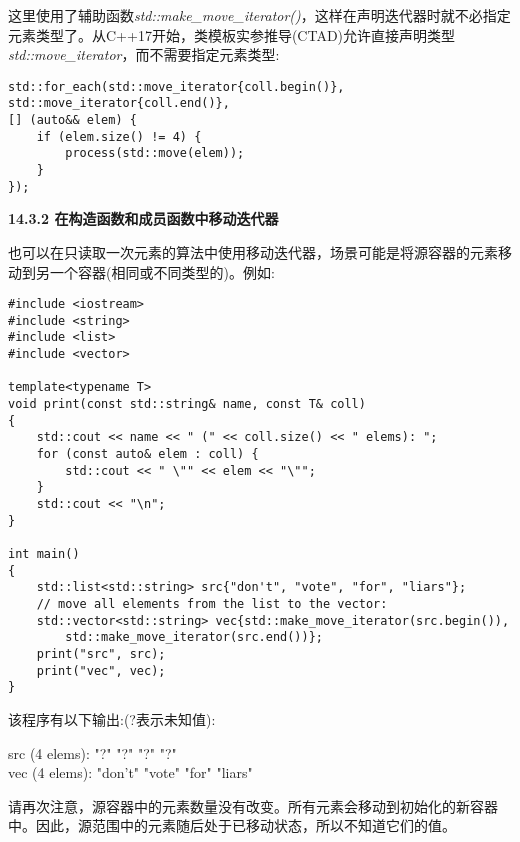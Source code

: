 这里使用了辅助函数\textit{std::make\_move\_iterator()}，这样在声明迭代器时就不必指定元素类型了。从C++17开始，类模板实参推导(CTAD)允许直接声明类型\textit{std::move\_iterator}，而不需要指定元素类型:\par

\begin{lstlisting}[caption={}]
std::for_each(std::move_iterator{coll.begin()},
std::move_iterator{coll.end()},
[] (auto&& elem) {
	if (elem.size() != 4) {
		process(std::move(elem));
	}
});
\end{lstlisting}

\hspace*{\fill} \par %
\textbf{14.3.2 在构造函数和成员函数中移动迭代器}

也可以在只读取一次元素的算法中使用移动迭代器，场景可能是将源容器的元素移动到另一个容器(相同或不同类型的)。例如:\par

{\color{red}{lib/moveitor.cpp}}\par

\begin{lstlisting}[caption={}]
#include <iostream>
#include <string>
#include <list>
#include <vector>

template<typename T>
void print(const std::string& name, const T& coll)
{
	std::cout << name << " (" << coll.size() << " elems): ";
	for (const auto& elem : coll) {
		std::cout << " \"" << elem << "\"";
	}
	std::cout << "\n";
}

int main()
{
	std::list<std::string> src{"don't", "vote", "for", "liars"};
	// move all elements from the list to the vector:
	std::vector<std::string> vec{std::make_move_iterator(src.begin()),
		std::make_move_iterator(src.end())};
	print("src", src);
	print("vec", vec);
}
\end{lstlisting}

该程序有以下输出:(?表示未知值):\par

\begin{tcolorbox}[colback=white,colframe=black]
src (4 elems): "?" "?" "?" "?" \\
vec (4 elems): "don't" "vote" "for" "liars"
\end{tcolorbox}

请再次注意，源容器中的元素数量没有改变。所有元素会移动到初始化的新容器中。因此，源范围中的元素随后处于已移动状态，所以不知道它们的值。\par













